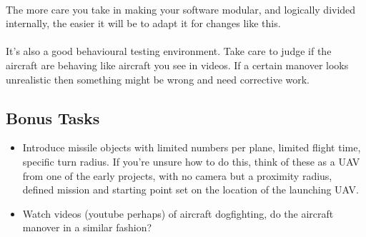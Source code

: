 \documentclass[11pt]{book}
\begin{document}
\paragraph{} The more care you take in making your software modular, and logically divided internally, the easier it will be to adapt it for changes like this.

\paragraph{} It's also a good behavioural testing environment. Take care to judge if the aircraft are behaving like aircraft you see in videos. If a certain manover looks unrealistic then something might be wrong and need corrective work. 

\subsection{Bonus Tasks}

\begin{itemize}
\item Introduce missile objects with limited numbers per plane, limited flight time, specific turn radius. If you're unsure how to do this, think of these as a UAV from one of the early projects, with no camera but a proximity radius, defined mission and starting point set on the location of the launching UAV.
\item Watch videos (youtube perhaps) of aircraft dogfighting, do the aircraft manover in a similar fashion?
\end{itemize}
\end{document}
